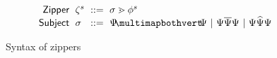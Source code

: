 \begin{figure}
  \vspace{-3px}
  \[
  \arraycolsep=3pt\begin{array}{rlrl}
      \mathsf{Zipper} & \zip^s & ::= & \zipper{\subject}{\tfrelem^s} \\
      \mathsf{Subject} & \subject & ::= &
        \pointing{\selection}{\selection} ~\vert~
        \selecting{\selection}{\selection}{\selection} ~\vert~
        \restructuring{\selection}{\selection}{\selection}
  \end{array}\]
  \caption{
    Syntax of zippers
  }
  \label{fig:zipper-syntax}
\end{figure}
